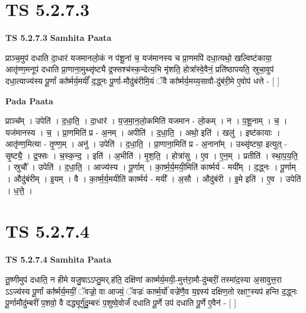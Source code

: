 \documentclass[17pt]{extarticle}
\begin{document}

\section{ TS 5.2.7.3 }

\textbf{TS 5.2.7.3 } \newline
\textbf{Samhita Paata} \newline

प्राञ्च॒मुप॑ दधाति दा॒धार॑ यजमानलो॒कं न प॑शू॒नां च॒ यज॑मानस्य च प्रा॒णमपि॑ दधा॒त्यथो॒ खल्विष्ट॑काया॒ आतृ॑ण्ण॒मनूप॑ दधाति प्रा॒णाना॒मुथ्सृ॑ष्ट्यै द्र॒फ्सश्च॑स्क॒न्देत्य॒भि मृ॑शति॒ होत्रा᳚स्वे॒वैनं॒ प्रति॑ष्ठापयति॒ स्रुचा॒वुप॑ दधा॒त्याज्य॑स्य पू॒र्णां का᳚र्ष्मर्य॒मयीं᳚ द॒द्ध्नः पू॒र्णा-मौदु॑बंरीमि॒यं ॅवै का᳚र्ष्मर्य॒मय्य॒सावौ-दु॑बंरी॒मे ए॒वोप॑ धत्ते - [  ] \newline

\textbf{Pada Paata} \newline

प्राञ्च᳚म् । उपेति॑ । द॒धा॒ति॒ । दा॒धार॑ । य॒ज॒मा॒न॒लो॒कमिति॑ यजमान - लो॒कम् । न । प॒शू॒नाम् । च॒ । यज॑मानस्य । च॒ । प्रा॒णमिति॑ प्र - अ॒नम् । अपीति॑ । द॒धा॒ति॒ । अथो॒ इति॑ । खलु॑ । इष्ट॑कायाः । आतृ॑ण्ण॒मित्या - तृ॒ण्ण॒म् । अनु॑ । उपेति॑ । द॒धा॒ति॒ । प्रा॒णाना॒मिति॑ प्र - अ॒नाना᳚म् । उथ्सृ॑ष्ट्या॒ इत्युत् - सृ॒ष्ट्यै॒ । द्र॒फ्सः । च॒स्क॒न्द॒ । इति॑ । अ॒भीति॑ । मृ॒श॒ति॒ । होत्रा॑सु । ए॒व । ए॒न॒म् । प्रतीति॑ । स्था॒प॒य॒ति॒ । स्रुचौ᳚ । उपेति॑ । द॒धा॒ति॒ । आज्य॑स्य । पू॒र्णाम् । का॒र्ष्म॒र्य॒मयी॒मिति॑ कार्ष्मर्य - मयी᳚म् । द॒द्ध्नः । पू॒र्णाम् । औदु॑बंरीम् । इ॒यम् । वै । का॒र्ष्म॒र्य॒मयीति॑ कार्ष्मर्य - मयी᳚ । अ॒सौ । औदु॑बंरी । इ॒मे इति॑ । ए॒व । उपेति॑ । ध॒त्ते॒ ।  \newline





\section{ TS 5.2.7.4 }

\textbf{TS 5.2.7.4 } \newline
\textbf{Samhita Paata} \newline

तू॒ष्णीमुप॑ दधाति॒ न हीमे यजु॒षाऽऽप्तु॒मर्.ह॑ति॒ दक्षि॑णां कार्ष्मर्य॒मयी॒-मुत्त॑रा॒मौ-दु॑म्बरीं॒ तस्मा॑द॒स्या अ॒सावुत्त॒रा ऽऽज्य॑स्य पू॒र्णां का᳚र्ष्मर्य॒मयीं॒ ॅवज्रो॒ वा आज्यं॒ ॅवज्रः॑ कार्ष्म॒र्यो॑ वज्रे॑णै॒व य॒ज्ञ्स्य॑ दक्षिण॒तो रक्षाꣳ॒॒स्यप॑ हन्ति द॒द्ध्नः पू॒र्णामौदु॑म्बरीं प॒शवो॒ वै दद्ध्यूर्गु॑दु॒म्बरः॑ प॒शुष्वे॒वोर्जं॑ दधाति पू॒र्णे उप॑ दधाति पू॒र्णे ए॒वैन॑ - [  ] \newline
\end{document}
